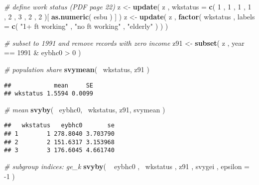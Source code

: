 \documentclass[]{book}
\newenvironment{Shaded}{\begin{snugshade}}{\end{snugshade}}
\newcommand{\KeywordTok}[1]{\textcolor[rgb]{0.13,0.29,0.53}{\textbf{{#1}}}}
\newcommand{\DataTypeTok}[1]{\textcolor[rgb]{0.13,0.29,0.53}{{#1}}}
\newcommand{\DecValTok}[1]{\textcolor[rgb]{0.00,0.00,0.81}{{#1}}}
\newcommand{\StringTok}[1]{\textcolor[rgb]{0.31,0.60,0.02}{{#1}}}
\newcommand{\CommentTok}[1]{\textcolor[rgb]{0.56,0.35,0.01}{\textit{{#1}}}}
\newcommand{\NormalTok}[1]{{#1}}
\begin{document}
\begin{Shaded}
\begin{Highlighting}[]
\CommentTok{# define work status (PDF page 22)}
\NormalTok{z <-}\StringTok{ }\KeywordTok{update}\NormalTok{( z , }\DataTypeTok{wkstatus =} \KeywordTok{c}\NormalTok{( }\DecValTok{1} \NormalTok{, }\DecValTok{1} \NormalTok{, }\DecValTok{1} \NormalTok{, }\DecValTok{1} \NormalTok{, }\DecValTok{2} \NormalTok{, }\DecValTok{3} \NormalTok{, }\DecValTok{2} \NormalTok{, }\DecValTok{2} \NormalTok{)[ }\KeywordTok{as.numeric}\NormalTok{( esbu ) ] )}
\NormalTok{z <-}\StringTok{ }\KeywordTok{update}\NormalTok{( z , }\KeywordTok{factor}\NormalTok{( wkstatus , }\DataTypeTok{labels =} \KeywordTok{c}\NormalTok{( }\StringTok{"1+ ft working"} \NormalTok{, }\StringTok{"no ft working"} \NormalTok{, }\StringTok{"elderly"} \NormalTok{) ) )}

\CommentTok{# subset to 1991 and remove records with zero income}
\NormalTok{z91 <-}\StringTok{ }\KeywordTok{subset}\NormalTok{( z , year ==}\StringTok{ }\DecValTok{1991} \NormalTok{&}\StringTok{ }\NormalTok{eybhc0 >}\StringTok{ }\DecValTok{0} \NormalTok{)}

\CommentTok{# population share}
\KeywordTok{svymean}\NormalTok{( ~wkstatus, z91 )}
\end{Highlighting}
\end{Shaded}

\begin{verbatim}
##            mean     SE
## wkstatus 1.5594 0.0099
\end{verbatim}

\begin{Shaded}
\begin{Highlighting}[]
\CommentTok{# mean}
\KeywordTok{svyby}\NormalTok{( ~eybhc0, ~wkstatus, z91, svymean )}
\end{Highlighting}
\end{Shaded}

\begin{verbatim}
##   wkstatus   eybhc0       se
## 1        1 278.8040 3.703790
## 2        2 151.6317 3.153968
## 3        3 176.6045 4.661740
\end{verbatim}

\begin{Shaded}
\begin{Highlighting}[]
\CommentTok{# subgroup indices: ge_k}
\KeywordTok{svyby}\NormalTok{( ~}\StringTok{ }\NormalTok{eybhc0 , ~wkstatus , z91 , svygei , }\DataTypeTok{epsilon =} \NormalTok{-}\DecValTok{1} \NormalTok{)}
\end{Highlighting}
\end{Shaded}
\end{document}
